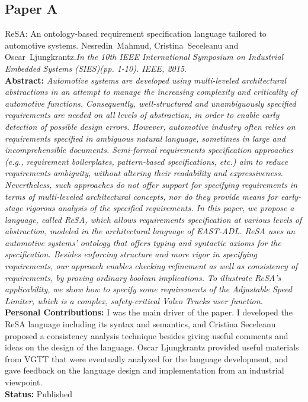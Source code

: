 \subsection*{Paper A}
ReSA: An ontology-based requirement specification language tailored to automotive systems. Nesredin~Mahmud, Cristina~Seceleanu and Oscar~Ljungkrantz.\textit{In the 10th IEEE International Symposium on Industrial Embedded Systems (SIES)(pp. 1-10). IEEE, 2015}.\label{lbl_resa}\\[6pt]
\textbf{Abstract:} \textit{Automotive systems are developed using multi-leveled architectural abstractions in an attempt to manage the increasing complexity and criticality of automotive functions. Consequently, well-structured and unambiguously specified requirements are needed on all levels of abstraction, in order to enable early detection of possible design errors. However, automotive industry often relies on requirements specified in ambiguous natural language, sometimes in large and incomprehensible documents. Semi-formal requirements specification approaches (e.g., requirement boilerplates, pattern-based specifications, etc.) aim to reduce requirements ambiguity, without altering their readability and expressiveness. Nevertheless, such approaches do not offer support for specifying requirements in terms of multi-leveled architectural concepts, nor do they provide means for early-stage rigorous analysis of the specified requirements. In this paper, we propose a language, called ReSA, which allows requirements specification at various levels of abstraction, modeled in the architectural language of EAST-ADL. ReSA uses an automotive systems' ontology that offers typing and syntactic axioms for the specification. Besides enforcing structure and more rigor in specifying requirements, our approach enables checking refinement as well as consistency of requirements, by proving ordinary boolean implications. To illustrate ReSA's applicability, we show how to specify some requirements of the Adjustable Speed Limiter, which is a complex, safety-critical Volvo Trucks user function.}\\[6pt]
\textbf{Personal Contributions: }I was the main driver of the paper. I developed the ReSA language including its syntax and semantics, and Cristina Seceleanu proposed a consistency analysis technique besides giving useful comments and ideas on the design of the language. Oscar Ljungkrantz provided useful materials from VGTT that were eventually analyzed for the language development, and gave feedback on the language design and implementation from an industrial viewpoint.\\
\textbf{Status:} Published

